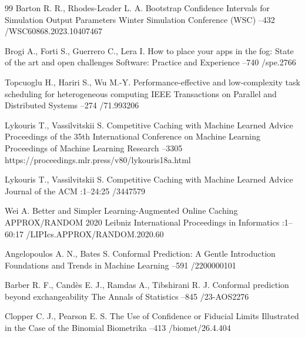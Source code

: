 \begin{thebibliography}{99}
\by Barton R. R., Rhodes-Leader L. A.
\paper Bootstrap Confidence Intervals for Simulation Output Parameters
 Winter Simulation Conference (WSC)
--432
/WSC60868.2023.10407467

\by Brogi A., Forti S., Guerrero C., Lera I.
\paper How to place your apps in the fog: State of the art and open challenges
\jour Software: Practice and Experience
--740
/spe.2766

\by Topcuoglu H., Hariri S., Wu M.-Y.
\paper Performance-effective and low-complexity task scheduling for heterogeneous computing
\jour IEEE Transactions on Parallel and Distributed Systems
--274
/71.993206

\by Lykouris T., Vassilvitskii S.
\paper Competitive Caching with Machine Learned Advice
\inbook Proceedings of the 35th International Conference on Machine Learning
\serial Proceedings of Machine Learning Research
--3305
\URL https://proceedings.mlr.press/v80/lykouris18a.html

\by Lykouris T., Vassilvitskii S.
\paper Competitive Caching with Machine Learned Advice
\jour Journal of the ACM
:1--24:25
/3447579

\by Wei A.
\paper Better and Simpler Learning-Augmented Online Caching
\inbook APPROX/RANDOM 2020
\serial Leibniz International Proceedings in Informatics
:1--60:17
/LIPIcs.APPROX/RANDOM.2020.60

\by Angelopoulos A. N., Bates S.
\paper Conformal Prediction: A Gentle Introduction
\jour Foundations and Trends in Machine Learning
--591
/2200000101

\by Barber R. F., Cand\`es E. J., Ramdas A., Tibshirani R. J.
\paper Conformal prediction beyond exchangeability
\jour The Annals of Statistics
--845
/23-AOS2276

\by Clopper C. J., Pearson E. S.
\paper The Use of Confidence or Fiducial Limits Illustrated in the Case of the Binomial
\jour Biometrika
--413
/biomet/26.4.404

\end{thebibliography}
